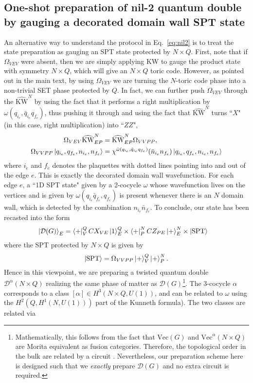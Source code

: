 \documentclass[nofootinbib,prx,twocolumn,showpacs,superscriptaddress,notitlepage,amsmath,amssymb]{revtex4-2}
\theoremstyle{definition}
\def\KWd{\widehat{\text{KW}}}
\def\SPT{\text{SPT}}
\def\bra#1{\mathinner{\langle{#1}|}}
\def\ket#1{\mathinner{|{#1}\rangle}}
\begin{document}
\subsection{One-shot preparation of nil-2 quantum double by gauging a decorated domain wall SPT state}\label{app:DDW}
An alternative way to understand the protocol in Eq.~\eqref{eq:nil2} is to treat the state preparation as gauging an SPT state protected by $N \times Q$. First, note that if $\Omega_{VEV}$ were absent, then we are simply applying KW to gauge the product state with symmetry $N \times Q$, which will give an $N\times Q$ toric code. However, as pointed out in the main text, by using $\Omega_{VEV}$ we are turning the $N$-toric code phase into a non-trivial SET phase protected by $Q$. In fact, we can further push $\Omega_{VEV}$ through the $\KWd^N$ by using the fact that it performs a right multiplication by $\omega(q_{i_e},\bar q_{i_e}q_{f_e})$, thus pushing it through and using the fact that $\KWd^{N}$ turns ``$X$" (in this case, right multiplication) into ``$ZZ$",
\begin{align}
    \Omega_{VEV}  \KWd^N_{EP} &= \KWd^N_{EP} \Omega_{VVPP},\\
    \Omega_{VVPP} \ket{q_{i_e}, q_{f_e},n_{i_{\check{e}}},n_{f_{\check{e}}} } &= \chi^{\bar \omega(q_{i_e},\bar q_{i_e}q_{f_e})}(\bar n_{i_{\check{e}}}  n_{f_{\check{e}}} )\ket{q_{i_e}, q_{f_e},n_{i_{\check{e}}},n_{f_{\check{e}}} }
\end{align}
where $i_{\check{e}}$ and  $f_{\check{e}}$ denotes the plaquettes with dotted lines pointing into and out of the edge $e$. This is exactly the decorated domain wall wavefunction\cite{decorateddomainwalls}. For each edge $e$, a ``1D SPT state" given by a 2-cocycle $\omega$ whose wavefunction lives on the vertices and is given by $\omega(q_{i_e}\bar q_{f_e},q_{f_e})$ is present whenever there is an $N$ domain wall, which is detected by the combination $n_{i_{\check{e}}}\bar n_{f_{\check{e}}}$. To conclude, our state has been recasted into the form
\begin{align}
     \ket{\mathcal D(G)}_E &=\bra{+}^Q_{V} CX_{VE} \ket{1}^Q_E \times   \bra{+}^N_P CZ_{PE}\ket{+}^N_E    \times  \ket{\SPT} 
\end{align}
where the SPT protected by $N\times Q$ is given by
\begin{align}
 \ket{\SPT}= \Omega_{VVPP} \ket{+}^Q_V \ket{+}^N_P.
\end{align}
Hence in this viewpoint, we are preparing a twisted quantum double $\mathcal D^\alpha(N\times Q)$ realizing the same phase of matter as $\mathcal D(G)$\footnote{Mathematically, this follows from the fact that $\text{Vec}(G)$ and $\text{Vec}^\alpha(N\times Q)$ are Morita equivalent as fusion categories. Therefore, the topological order in the bulk are related by a circuit \cite{Lootens22}. Nevertheless, our preparation scheme here is designed such that we \textit{exactly} prepare $\mathcal D(G)$ and no extra circuit is required.}. The 3-cocycle $\alpha$ corresponds to a class $[\alpha] \in H^3(N \times Q,U(1))$, and can be related to $\omega$ using the $H^2(Q,H^1(N,U(1)))$ part of the Kunneth formula). The two classes are related via\cite{HuWan20,Tachikawa_2020}
\end{document}

